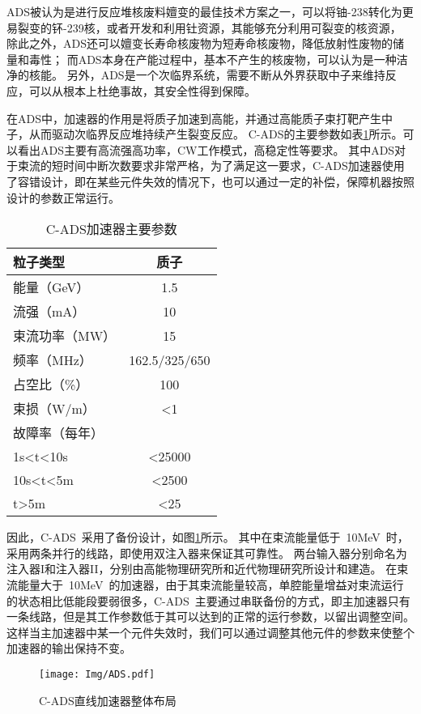 ADS被认为是进行反应堆核废料嬗变的最佳技术方案之一，可以将铀-238转化为更易裂变的钚-239核，或者开发和利用钍资源，其能够充分利用可裂变的核资源，
除此之外，ADS还可以嬗变长寿命核废物为短寿命核废物，降低放射性废物的储量和毒性；
而ADS本身在产能过程中，基本不产生的核废物，可以认为是一种洁净的核能。
另外，ADS是一个次临界系统，需要不断从外界获取中子来维持反应，可以从根本上杜绝事故，其安全性得到保障。

在ADS中，加速器的作用是将质子加速到高能，并通过高能质子束打靶产生中子，从而驱动次临界反应堆持续产生裂变反应。
C-ADS的主要参数如表\ref{tab:C_ADS_parameter}所示\cite{zhihuili2011ADS}。可以看出ADS主要有高流强高功率，CW工作模式，高稳定性等要求。
其中ADS对于束流的短时间中断次数要求非常严格，为了满足这一要求，C-ADS加速器使用了容错设计，即在某些元件失效的情况下，也可以通过一定的补偿，保障机器按照设计的参数正常运行。

\begin{table}[!htb]
  \centering
  \begin{tabular}{>{\small}l|c}
    \hline
    粒子类型              &质子  \\
    \hline
    能量（GeV）           &1.5   \\
    \hline
    流强（mA）            &10    \\
    \hline
    束流功率（MW）        &15    \\
    \hline
    频率（MHz）           &162.5/325/650  \\
    \hline
    占空比（\%）          &100   \\
    \hline
    束损（W/m）           &<1    \\
    \hline
    故障率（每年）        & \\
    \qquad 1s<t<10s        & <25000 \\
    \qquad 10s<t<5m        & <2500  \\
    \qquad t>5m            & <25    \\
    \hline
  \end{tabular}
  \caption{C-ADS加速器主要参数}
  \label{tab:C_ADS_parameter}
\end{table}

因此，C-ADS~采用了备份设计，如图\ref{fig:ADS_two_injector}所示\cite{fang2014physics,fang2016instability}。
其中在束流能量低于~10MeV~时，采用两条并行的线路，即使用双注入器来保证其可靠性。
两台输入器分别命名为注入器I和注入器II，分别由高能物理研究所和近代物理研究所设计和建造。
在束流能量大于~10MeV~的加速器，由于其束流能量较高，单腔能量增益对束流运行的状态相比低能段要弱很多，C-ADS~主要通过串联备份的方式，即主加速器只有一条线路，但是其工作参数低于其可以达到的正常的运行参数，以留出调整空间。
这样当主加速器中某一个元件失效时，我们可以通过调整其他元件的参数来使整个加速器的输出保持不变。


\begin{figure}[!htb]
    \centering
    \texttt{[image: Img/ADS.pdf]}
    \caption{C-ADS直线加速器整体布局}
    \label{fig:ADS_two_injector}
\end{figure}


